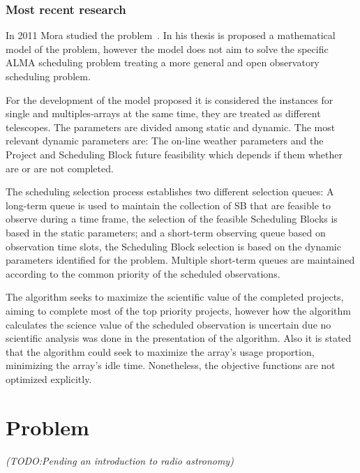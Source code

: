\documentclass[11pt]{article}
\begin{document}
\subsubsection{Most recent research}
In 2011 Mora studied the problem~\cite{mora11}. In his thesis is proposed a mathematical model of the problem, however the model does not aim to solve the specific ALMA scheduling problem treating a more general and open observatory scheduling problem. 

For the development of the model proposed it is considered the instances for single and multiples-arrays at the same time, they are treated as different telescopes. The parameters are divided among static and dynamic. The most relevant dynamic parameters are: The on-line weather parameters and the Project and Scheduling Block future feasibility which depends if them whether are or are not completed.

The scheduling selection process establishes two different selection queues: A long-term queue is used to maintain the collection of SB that are feasible to observe during a time frame, the selection of the feasible Scheduling Blocks is based in the static parameters; and a short-term observing queue based on observation time slots, the Scheduling Block selection is based on the dynamic parameters identified for the problem. Multiple short-term queues are maintained according to the common priority of the scheduled observations.

The algorithm seeks to maximize the scientific value of the completed projects, aiming to complete most of the top priority projects, however how the algorithm calculates the science value of the scheduled observation is uncertain due no scientific analysis was done in the presentation of the algorithm. Also it is stated that the algorithm could seek to maximize the array's usage proportion, minimizing the array's idle time. Nonetheless, the objective functions are not optimized explicitly.


\newpage
\section{Problem}
\label{sec:problem}
\textit{(TODO:Pending an introduction to radio astronomy)}
\end{document}
